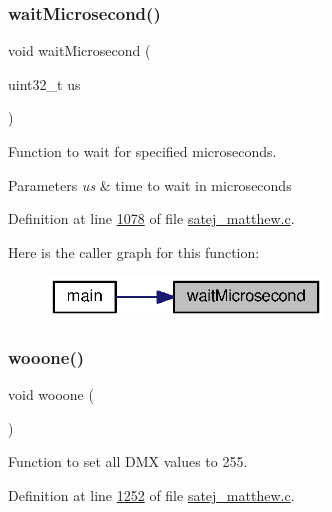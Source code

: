 \subsubsection{\texorpdfstring{waitMicrosecond()}{waitMicrosecond()}}
{\footnotesize\ttfamily void wait\+Microsecond (\begin{DoxyParamCaption}\item[{uint32\+\_\+t}]{us }\end{DoxyParamCaption})}



Function to wait for specified microseconds. 


\begin{DoxyParams}{Parameters}
{\em us} & time to wait in microseconds \\
\hline
\end{DoxyParams}


Definition at line \mbox{\hyperlink{satej__matthew_8c_source_l01078}{1078}} of file \mbox{\hyperlink{satej__matthew_8c_source}{satej\+\_\+matthew.\+c}}.

Here is the caller graph for this function\+:
\nopagebreak
\begin{figure}[H]
\begin{center}
\leavevmode
\includegraphics[width=207pt]{satej__matthew_8c_af97018ae05e94f602f956c08ef08c36c_icgraph}
\end{center}
\end{figure}
\mbox{\label{satej__matthew_8c_a35d3aeb4661540f67e367e4e328c6c88}} 
\subsubsection{\texorpdfstring{wooone()}{wooone()}}
{\footnotesize\ttfamily void wooone (\begin{DoxyParamCaption}{ }\end{DoxyParamCaption})}



Function to set all D\+MX values to 255. 



Definition at line \mbox{\hyperlink{satej__matthew_8c_source_l01252}{1252}} of file \mbox{\hyperlink{satej__matthew_8c_source}{satej\+\_\+matthew.\+c}}.

